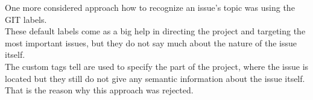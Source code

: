 One more considered approach how to recognize an issue's topic was using the GIT labels. \\
These default labels come as a big help in directing the project and targeting the most important issues, but they do not say much about the nature of the issue itself.\\
The custom tags tell are used to specify the part of the project, where the issue is located but they still do not give any semantic information about the issue itself. That is the reason why this approach was rejected. 
